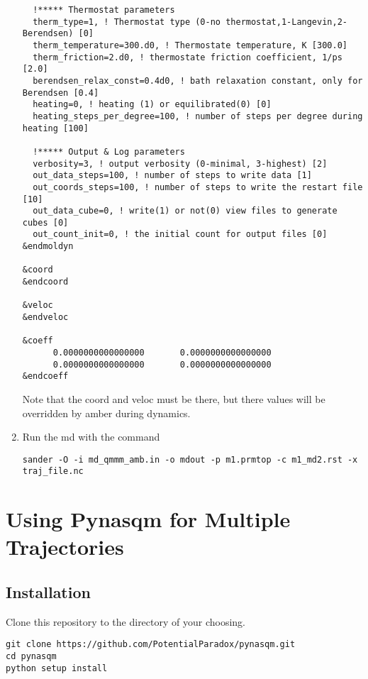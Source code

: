 \documentclass[11pt]{article}
\begin{document}
\begin{enumerate}
\begin{verbatim}
  !***** Thermostat parameters
  therm_type=1, ! Thermostat type (0-no thermostat,1-Langevin,2-Berendsen) [0]
  therm_temperature=300.d0, ! Thermostate temperature, K [300.0]
  therm_friction=2.d0, ! thermostate friction coefficient, 1/ps [2.0]
  berendsen_relax_const=0.4d0, ! bath relaxation constant, only for Berendsen [0.4]
  heating=0, ! heating (1) or equilibrated(0) [0]
  heating_steps_per_degree=100, ! number of steps per degree during heating [100]

  !***** Output & Log parameters
  verbosity=3, ! output verbosity (0-minimal, 3-highest) [2]
  out_data_steps=100, ! number of steps to write data [1]
  out_coords_steps=100, ! number of steps to write the restart file [10]
  out_data_cube=0, ! write(1) or not(0) view files to generate cubes [0]
  out_count_init=0, ! the initial count for output files [0]
&endmoldyn

&coord
&endcoord

&veloc
&endveloc

&coeff
      0.0000000000000000       0.0000000000000000
      0.0000000000000000       0.0000000000000000
&endcoeff

\end{verbatim}

Note that the coord and veloc must be there, but there values will be
overridden by amber during dynamics.
\item Run the md with the command
\begin{verbatim}
sander -O -i md_qmmm_amb.in -o mdout -p m1.prmtop -c m1_md2.rst -x traj_file.nc
\end{verbatim}
\end{enumerate}
\section{Using Pynasqm for Multiple Trajectories}
\label{sec:orge60bd1c}
\subsection{Installation}
\label{sec:org705388a}
Clone this repository to the directory of your choosing.
\begin{verbatim}
git clone https://github.com/PotentialParadox/pynasqm.git
cd pynasqm
python setup install
\end{verbatim}
\end{document}
